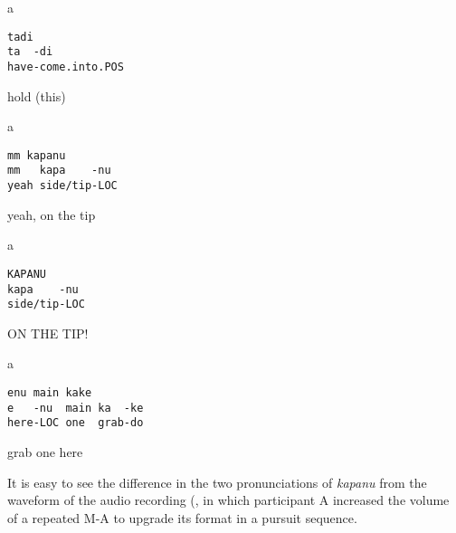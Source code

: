 \documentclass[output=paper]{langsci/langscibook}
\begin{document}
\vspace{-1mm}
%
\begin{mdframednoverticalspace}[style=firstfoc]
\begin{transbox}{1}{a}
\begin{verbatim}
tadi
ta  -di
have-come.into.POS
\end{verbatim}
 hold (this)
\end{transbox}
\end{mdframednoverticalspace}
%
\begin{mdframednoverticalspace}[style=secondfoc]
\end{mdframednoverticalspace}
%
\begin{mdframednoverticalspace}[style=firstfoc]
\begin{transbox}{3}{a}
\begin{verbatim}
mm kapanu
mm   kapa    -nu
yeah side/tip-LOC
\end{verbatim}
yeah, on the tip
\end{transbox}
\end{mdframednoverticalspace}
%
\begin{mdframednoverticalspace}[style=secondfoc]
\end{mdframednoverticalspace}
%
\begin{mdframednoverticalspace}[style=firstfoc]
\begin{transbox}{5}{a}
\begin{verbatim}
KAPANU
kapa    -nu
side/tip-LOC
\end{verbatim}
ON THE TIP!
\end{transbox}
\end{mdframednoverticalspace}\vspace{1mm}
%
\begin{mdframednoverticalspace}[style=secondfoc]
\end{mdframednoverticalspace}\vspace{-2mm}
%
\begin{transbox}{7}{a}
\begin{verbatim}
enu main kake
e   -nu  main ka  -ke
here-LOC one  grab-do
\end{verbatim}
grab one here
\end{transbox}\bigskip

It is easy to see the difference in the two pronunciations of \textit{kapanu} from the waveform of the audio recording (, in which participant A increased the volume of a repeated M-A to upgrade its format in a pursuit sequence.
\end{document}
